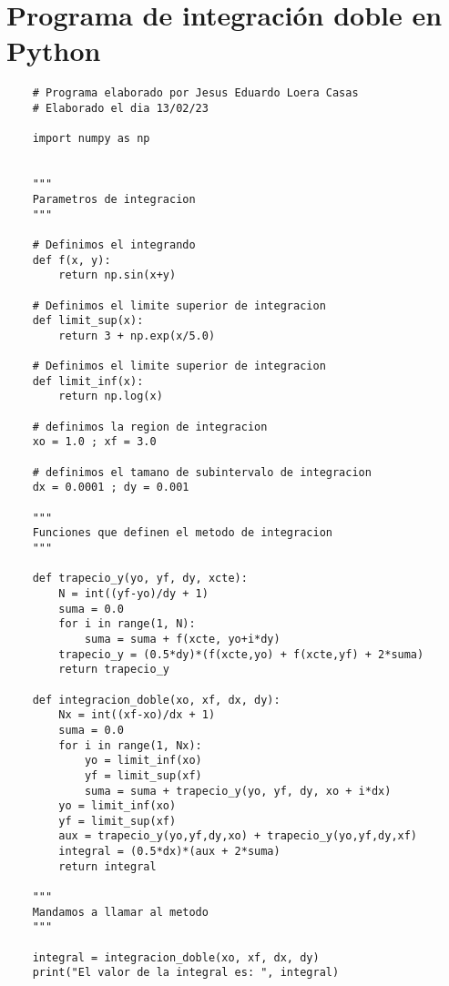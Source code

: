\section{Programa de integración doble en Python}


\begin{lstlisting}
    # Programa elaborado por Jesus Eduardo Loera Casas
    # Elaborado el dia 13/02/23
     
    import numpy as np
    
    
    """
    Parametros de integracion
    """
    
    # Definimos el integrando
    def f(x, y):
        return np.sin(x+y)
    
    # Definimos el limite superior de integracion
    def limit_sup(x):
        return 3 + np.exp(x/5.0)
    
    # Definimos el limite superior de integracion
    def limit_inf(x):
        return np.log(x)
    
    # definimos la region de integracion
    xo = 1.0 ; xf = 3.0
    
    # definimos el tamano de subintervalo de integracion
    dx = 0.0001 ; dy = 0.001
    
    """
    Funciones que definen el metodo de integracion
    """
    
    def trapecio_y(yo, yf, dy, xcte):
        N = int((yf-yo)/dy + 1)
        suma = 0.0
        for i in range(1, N):
            suma = suma + f(xcte, yo+i*dy)
        trapecio_y = (0.5*dy)*(f(xcte,yo) + f(xcte,yf) + 2*suma)
        return trapecio_y
    
    def integracion_doble(xo, xf, dx, dy):
        Nx = int((xf-xo)/dx + 1)
        suma = 0.0
        for i in range(1, Nx):
            yo = limit_inf(xo)
            yf = limit_sup(xf)
            suma = suma + trapecio_y(yo, yf, dy, xo + i*dx)
        yo = limit_inf(xo)
        yf = limit_sup(xf)
        aux = trapecio_y(yo,yf,dy,xo) + trapecio_y(yo,yf,dy,xf)
        integral = (0.5*dx)*(aux + 2*suma)
        return integral
    
    """
    Mandamos a llamar al metodo
    """
    
    integral = integracion_doble(xo, xf, dx, dy)
    print("El valor de la integral es: ", integral)
\end{lstlisting}


 
